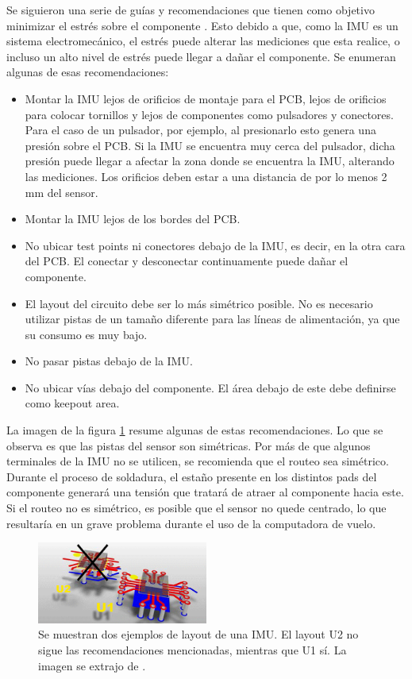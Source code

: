 Se siguieron una serie de guías y recomendaciones que tienen como objetivo minimizar el estrés sobre el componente \cite{IMUpcb_1} \cite{IMUpcb_2} \cite{IMUpcb_3}. Esto debido a que, como la IMU es un sistema electromecánico, el estrés puede alterar las mediciones que esta realice, o incluso un alto nivel de estrés puede llegar a dañar el componente. Se enumeran algunas de esas recomendaciones:

\begin{itemize}
    \item Montar la IMU lejos de orificios de montaje para el PCB, lejos de orificios para colocar tornillos y lejos de componentes como pulsadores y conectores. Para el caso de un pulsador, por ejemplo, al presionarlo esto genera una presión sobre el PCB. Si la IMU se encuentra muy cerca del pulsador, dicha presión puede llegar a afectar la zona donde se encuentra la IMU, alterando las mediciones. Los orificios deben estar a una distancia de por lo menos 2 mm del sensor.
    \item Montar la IMU lejos de los bordes del PCB.
    \item No ubicar test points ni conectores debajo de la IMU, es decir, en la otra cara del PCB. El conectar y desconectar continuamente puede dañar el componente.
    \item El layout del circuito debe ser lo más simétrico posible. No es necesario utilizar pistas de un tamaño diferente para las líneas de alimentación, ya que su consumo es muy bajo.
    \item No pasar pistas debajo de la IMU.
    \item No ubicar vías debajo del componente. El área debajo de este debe definirse como keepout area.
\end{itemize}

La imagen de la figura \ref{fig:IMU_recomendaciones_layout} resume algunas de estas recomendaciones. Lo que se observa es que las pistas del sensor son simétricas. Por más de que algunos terminales de la IMU no se utilicen, se recomienda que el routeo sea simétrico. Durante el proceso de soldadura, el estaño presente en los distintos pads del componente generará una tensión que tratará de atraer al componente hacia este. Si el routeo no es simétrico, es posible que el sensor no quede centrado, lo que resultaría en un grave problema durante el uso de la computadora de vuelo.

\begin{figure}[H]
    \centering
    \includegraphics[width=0.5\textwidth]{img/IMU_recomendaciones_layout.png}
    \caption{Se muestran dos ejemplos de layout de una IMU. El layout U2 no sigue las recomendaciones mencionadas, mientras que U1 sí. La imagen se extrajo de \cite{IMUpcb_3}.}
    \label{fig:IMU_recomendaciones_layout}
\end{figure}

